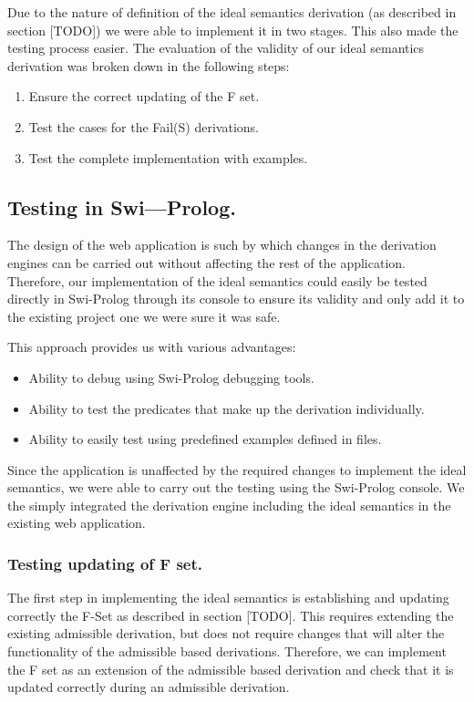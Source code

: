 Due to the nature of definition of the ideal semantics derivation (as described in section [TODO]) we were able to implement it in two stages. This also made the testing process easier. The evaluation of the validity of our ideal semantics derivation  was broken down in the following steps:

\begin{enumerate}
\item Ensure the correct updating of the F set.
\item Test the cases for the Fail(S) derivations.
\item Test the complete implementation with examples.
\end{enumerate}

\subsection{Testing in Swi---Prolog.}
The design of the web application is such by which changes in the derivation engines can be carried out without affecting the rest of the application. Therefore, our implementation of the ideal semantics could easily be tested directly in Swi-Prolog through its console to ensure its validity and only add it to the existing project one we were sure it was safe.

This approach provides us with various advantages:

\begin{itemize}
\item Ability to debug using Swi-Prolog debugging tools.
\item Ability to test the predicates that make up the derivation individually.
\item Ability to easily test using predefined examples defined in files.
\end{itemize}

Since the application is unaffected by the required changes to implement the ideal semantics, we were able to carry out the testing using the Swi-Prolog console. We the simply integrated the derivation engine including the ideal semantics in the existing web application.

\subsubsection{Testing updating of F set.}
The first step in implementing the ideal semantics is establishing and updating correctly the F-Set as described in section [TODO]. This requires extending the existing admissible derivation, but does not require changes that will alter the functionality of the admissible based derivations. Therefore, we can implement the F set as an extension of the admissible based derivation and check that it is updated correctly during an admissible derivation.

